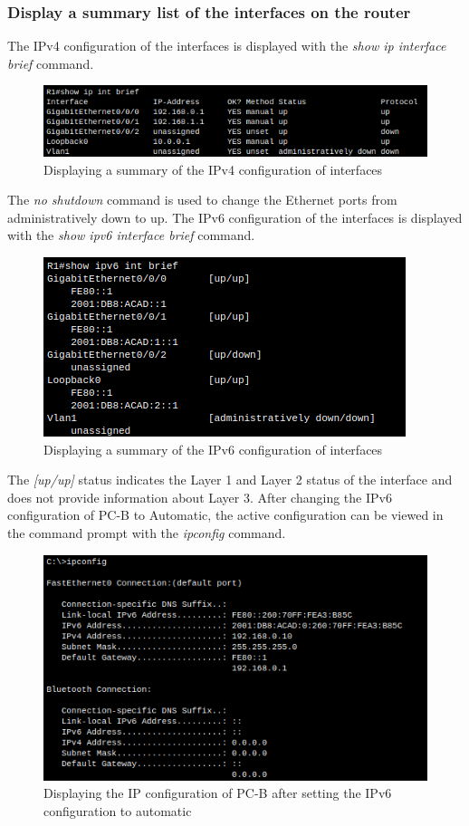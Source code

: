 \documentclass[a4paper]{article}
\newcommand{\abc}{\hfill \break}
\newcommand{\ii}{\textit}
\begin{document}
\subsubsection{Display a summary list of the interfaces on the router}
The IPv4 configuration of the interfaces is displayed with the \ii{show ip interface brief} command.
\begin{figure}[h]
	\includegraphics[scale=0.40]{images/showipintbrief.png}
	\centering
	\caption{Displaying a summary of the IPv4 configuration of interfaces}
\end{figure}\abc
The \ii{no shutdown} command is used to change the Ethernet ports from administratively down to up.\abc
The IPv6 configuration of the interfaces is displayed with the \ii{show ipv6 interface brief} command.
\begin{figure}[h]
	\includegraphics[scale=0.40]{images/showipv6intbrief.png}
	\centering
	\caption{Displaying a summary of the IPv6 configuration of interfaces}
\end{figure}\abc
The \ii{[up/up]} status indicates the Layer 1 and Layer 2 status of the interface and does not provide information about Layer 3.\newpage\abc
After changing the IPv6 configuration of PC-B to Automatic, the active configuration can be viewed in the command prompt with the \ii{ipconfig} command.
\begin{figure}[h]
	\includegraphics[scale=0.40]{images/ipconf.png}
	\centering
	\caption{Displaying the IP configuration of PC-B after setting the IPv6 configuration to automatic}
\end{figure}\abc
\end{document}
